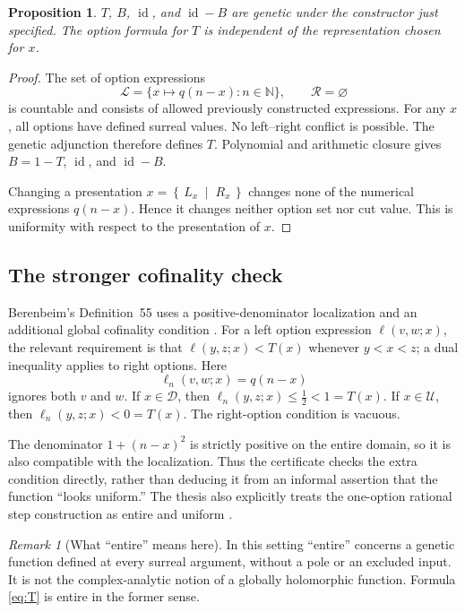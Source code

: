 \documentclass[11pt,letterpaper]{article}
\numberwithin{equation}{section}
\newtheorem{proposition}[theorem]{Proposition}
\theoremstyle{definition}
\theoremstyle{remark}
\newtheorem{remark}[theorem]{Remark}
\newcommand{\N}{\mathbb{N}}
\newcommand{\U}{\mathcal{U}}
\newcommand{\D}{\mathcal{D}}
\newcommand{\cut}[2]{\left\{\,#1\;\middle|\;#2\,\right\}}
\newcommand{\id}{\operatorname{id}}
\newcommand{\source}[2]{\cite[#1]{#2}}
\begin{document}
\begin{proposition}\label{prop:genetic}
$T$, $B$, $\id$, and $\id-B$ are genetic under the constructor just
specified. The option formula for $T$ is independent of the representation
chosen for $x$.
\end{proposition}
\begin{proof}
The set of option expressions
\[
 \mathscr L=\{x\mapsto q(n-x):n\in\N\},\qquad
 \mathscr R=\varnothing
\]
is countable and consists of allowed previously constructed expressions.
For any $x$, all options have defined surreal values. No left--right
conflict is possible. The genetic adjunction therefore defines $T$.
Polynomial and arithmetic closure gives $B=1-T$, $\id$, and $\id-B$.

Changing a presentation $x=\cut{L_x}{R_x}$ changes none of the numerical
expressions $q(n-x)$. Hence it changes neither option set nor cut value.
This is uniformity with respect to the presentation of $x$.
\end{proof}

\subsection{The stronger cofinality check}
Berenbeim's Definition~55 uses a positive-denominator localization and an
additional global cofinality condition \source{pp.~126--128}{Berenbeim}.
For a left option expression $\ell(v,w;x)$, the relevant requirement is
that $\ell(y,z;x)<T(x)$ whenever $y<x<z$; a dual inequality applies to
right options. Here
\[
 \ell_n(v,w;x)=q(n-x)
\]
ignores both $v$ and $w$. If $x\in\D$, then
$\ell_n(y,z;x)\le\tfrac12<1=T(x)$. If $x\in\U$, then
$\ell_n(y,z;x)<0=T(x)$. The right-option condition is vacuous.

The denominator $1+(n-x)^2$ is strictly positive on the entire domain, so
it is also compatible with the localization. Thus the certificate checks
the extra condition directly, rather than deducing it from an informal
assertion that the function ``looks uniform.'' The thesis also explicitly
treats the one-option rational step construction as entire and uniform
\source{pp.~133--134}{Berenbeim}.

\begin{remark}[What ``entire'' means here]
In this setting ``entire'' concerns a genetic function defined at every
surreal argument, without a pole or an excluded input. It is not the
complex-analytic notion of a globally holomorphic function. Formula
\eqref{eq:T} is entire in the former sense.
\end{remark}
\end{document}
